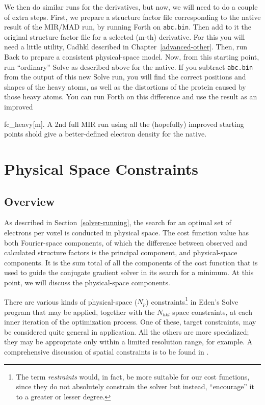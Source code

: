 \documentclass{report}
\begin{document}
We then
do similar runs for the derivatives, but now, we will need to do a couple of
extra steps.  First, we prepare a structure factor file corresponding to the 
native result of the MIR/MAD run, by running Forth on {\tt abc.bin}.
Then add to it the original structure factor file for a selected (m-th)
derivative.  For this you will need a little utility, 
Cadhkl described in Chapter~\ref{advanced-other}.  
Then, run Back to prepare a consistent physical-space model.  
Now, from this starting point, run ``ordinary'' Solve as described above for 
the native.
If you subtract {\tt abc.bin} from the output of this new Solve run, you will 
find the correct positions and shapes of the heavy atoms, as well as the
distortions of the protein caused by those heavy atoms.  You can run Forth on
this difference and use the result as an improved {fc\_heavy[m].
A 2nd full MIR run using all the (hopefully) improved starting points shold 
give a better-defined electron density for the native.


\chapter {Physical Space Constraints}
\label{constraints}

\section {Overview}
\label{constraints-overview}

As described in Section~{\ref{solver-running}}, the search for an optimal set of electrons per voxel
is conducted in physical space.  The cost function value has both Fourier-space
components, of which the difference between observed and calculated structure factors
is the principal component, and physical-space components.  It is the sum total of all
the components of the cost function that is used to guide the conjugate gradient solver in 
its search for a minimum.  At this point, we will
discuss the physical-space components.

There are various kinds of physical-space ($N_p$) constraints\footnote
{The term {\em restraints} would, in fact, be more suitable
for our cost functions, since they do not absolutely constrain the solver 
but instead, ``encourage'' it to a greater or lesser degree.}
in Eden's Solve program that may be applied, together with the $N_{hkl}$
space constraints, at each inner iteration of the optimization process.  
One of these, target constraints, may be 
considered quite general in application.  All the others are more specialized;
they may be appropriate only within a limited resolution range, for example.
A comprehensive discussion of spatial constraints is to be found in \cite{eden7}.

}
\end{document}
